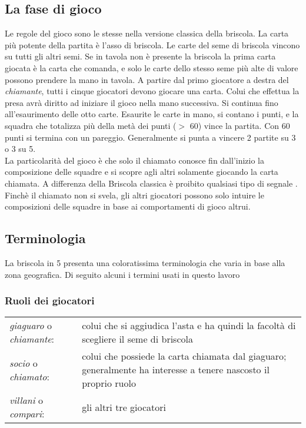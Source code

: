 \subsection{La fase di gioco}

Le regole del gioco sono le stesse nella versione classica della briscola.
La carta più potente della partita è l'asso di briscola.
Le carte del seme di briscola vincono su tutti gli altri semi.
Se in tavola non è presente la briscola la prima carta giocata è la carta che comanda, e solo le carte dello stesso seme più alte di valore possono prendere la mano in tavola.
A partire dal primo giocatore a destra del \emph{chiamante}, tutti i cinque giocatori devono giocare una carta.
Colui che effettua la presa avrà diritto ad iniziare il gioco nella mano successiva.
Si continua fino all'esaurimento delle otto carte. Esaurite le carte in mano, si contano i punti, e la squadra che totalizza più della metà dei punti ($ > $ 60) vince la partita.
Con 60 punti si termina con un pareggio.
Generalmente si punta a vincere 2 partite su 3 o 3 su 5.\\
La particolarità del gioco è che solo il chiamato conosce fin dall'inizio la composizione delle squadre e si scopre agli altri solamente giocando la carta chiamata. A differenza della Briscola classica è proibito qualsiasi tipo di segnale \cite{enciclopediacarte}.\\
Finchè il chiamato non si svela, gli altri giocatori possono solo intuire le composizioni delle squadre in base ai comportamenti di gioco altrui.

\subsection{Terminologia}

La briscola in 5 presenta una coloratissima terminologia che varia in base alla zona geografica.
Di seguito alcuni i termini usati in questo lavoro

\subsubsection*{Ruoli dei giocatori}
\vspace{4mm}
\begin{tabular}{l p{}}
\emph{giaguaro} o \emph{chiamante}: & colui che si aggiudica l'asta e ha quindi la facoltà di scegliere il seme di briscola \\
\emph{socio} o \emph{chiamato}: & colui che possiede la carta chiamata dal giaguaro; generalmente ha interesse a tenere nascosto il proprio ruolo \\
\emph{villani} o \emph{compari}: & gli altri tre giocatori \\   
\end{tabular}\\


